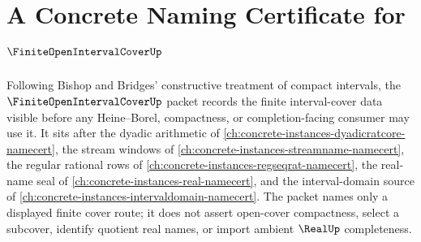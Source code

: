 \chapter{A Concrete Naming Certificate for $\FiniteOpenIntervalCoverUp$}
\label{ch:concrete-instances-finite-open-interval-cover-namecert}

Following Bishop and Bridges' constructive treatment of compact intervals, the $\FiniteOpenIntervalCoverUp$ packet records the finite interval-cover data visible before any Heine--Borel, compactness, or completion-facing consumer may use it. It sits after the dyadic arithmetic of \autoref{ch:concrete-instances-dyadicratcore-namecert}, the stream windows of \autoref{ch:concrete-instances-streamname-namecert}, the regular rational rows of \autoref{ch:concrete-instances-regseqrat-namecert}, the real-name seal of \autoref{ch:concrete-instances-real-namecert}, and the interval-domain source of \autoref{ch:concrete-instances-intervaldomain-namecert}. The packet names only a displayed finite cover route; it does not assert open-cover compactness, select a subcover, identify quotient real names, or import ambient $\RealUp$ completeness.

